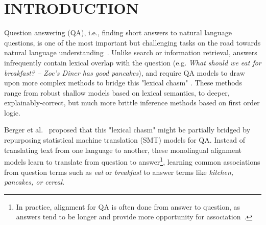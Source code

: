 \chapter{INTRODUCTION\label{chapter:introduction}}

\address{Start by explaining why NLI and QA are fundamental NLP tasks. Give examples to search, and personal assistants.}

\address{Natural language inference (NLI)}

\address{while FOL methods are attractive for their formality, it is this same formality that renders them too brittle to be of much use outside of small, toy domains.}

\address{Here we focus on approximating this inference using natural language instead of formal representations (e.g. ccg parses, etc)}

\address{methods that can be applied in much broader domains, with an emphasis on semi- and distant supervision, rather than needing a large amount of hand-generated training data.}

\address{With the relaxation of the formality, the danger is in losing the explainability, and so we use/include models that use a human-readable intermediate output generated by the model to provide an explanation for the inference performed by the model.}



Question answering (QA), i.e., finding short answers to natural language questions, is one of the most important but challenging 
tasks on the road towards natural language understanding~\cite{Etzioni:11}. 
Unlike search or information retrieval, answers infrequently contain lexical overlap with the question (e.g. {\em What should we eat for breakfast? -- Zoe's Diner has good pancakes}), and require QA models to draw upon more complex methods to bridge this "lexical chasm" \cite{Berger:00}.  These methods range from robust shallow models based on lexical semantics, to deeper, explainably-correct, but much more brittle inference methods based on first order logic.  


Berger et al.~\citeyear{Berger:00} proposed that this "lexical chasm" might be partially bridged by repurposing statistical machine translation (SMT) models for QA. Instead of translating text from one language to another, these monolingual alignment models learn to translate from question to answer\footnote{In practice, alignment for QA is often done from answer to question, as answers tend to be longer and provide more opportunity for association~\cite{Surdeanu:11}.}, learning common associations from question terms such as {\em eat} or {\em breakfast} to answer terms like {\em kitchen, pancakes, or cereal}.

